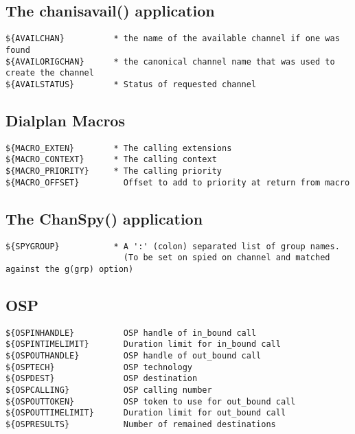 \subsection{The chanisavail() application}
\begin{verbatim}
${AVAILCHAN}          * the name of the available channel if one was found
${AVAILORIGCHAN}      * the canonical channel name that was used to create the channel
${AVAILSTATUS}        * Status of requested channel
\end{verbatim}

\subsection{Dialplan Macros}
\begin{verbatim}
${MACRO_EXTEN}        * The calling extensions
${MACRO_CONTEXT}      * The calling context
${MACRO_PRIORITY}     * The calling priority
${MACRO_OFFSET}         Offset to add to priority at return from macro
\end{verbatim}

\subsection{The ChanSpy() application}
\begin{verbatim}
${SPYGROUP}           * A ':' (colon) separated list of group names.
                        (To be set on spied on channel and matched against the g(grp) option)
\end{verbatim}

\subsection{OSP}
\begin{verbatim}
${OSPINHANDLE}          OSP handle of in_bound call
${OSPINTIMELIMIT}       Duration limit for in_bound call
${OSPOUTHANDLE}         OSP handle of out_bound call
${OSPTECH}              OSP technology
${OSPDEST}              OSP destination
${OSPCALLING}           OSP calling number
${OSPOUTTOKEN}          OSP token to use for out_bound call
${OSPOUTTIMELIMIT}      Duration limit for out_bound call
${OSPRESULTS}           Number of remained destinations
\end{verbatim}
